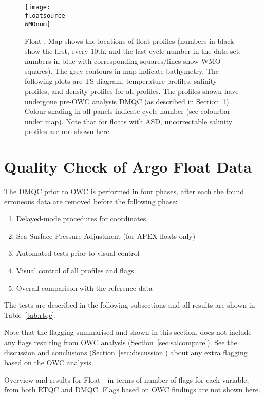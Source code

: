 \documentclass{article}
\begin{document}
\begin{figure}[hp]
  \centerline{\texttt{[image: \\floatsource\\WMOnum]}}
  \caption{Float \WMOnum. Map shows the locations of float profiles (numbers in
    black show the first, every 10th, and the last cycle number in the data
    set; numbers in blue with corresponding squares/lines show
    WMO-squares). The grey contours in map indicate bathymetry. The
    following plots are TS-diagram, temperature profiles, salinity
    profiles, and density profiles for all profiles. The profiles shown
    have undergone pre-OWC analysis DMQC (as described in
    Section~\protect\ref{DMQCpreOWC}).  Colour shading in all panels
    indicate cycle number (see colourbar under map).
    Note that for floats with ASD, uncorrectable salinity profiles are not
    shown here.}
  \label{fig:float-info}
\end{figure} 
 
        
\newpage
\section{Quality Check of Argo Float Data}\label{DMQCpreOWC}
%
The DMQC prior to OWC is performed in four phases, after each the found
erroneous data are removed before the following phase:
\begin{enumerate}
\item Delayed-mode procedures for coordinates
\item Sea Surface Pressure Adjustment (for APEX floats only)
\item Automated tests prior to visual control
\item Visual control of all profiles and flags
\item Overall comparison with the reference data
\end{enumerate}
The tests are described in the following subsections and all results are
shown in Table~\ref{tab:rtqc}.
%
%

% 
Note that the flagging summarised and shown in this section, does not
include any flags resulting from OWC analysis (Section~\ref{sec:salcompare}). See
the discussion and conclusions (Section~\ref{sec:discussion}) about any
extra flagging based on the OWC analysis.
%
\begin{table}[!ht]
  \caption{Overview and results for Float~\WMOnum\ in terms of number of
    flags for each variable, from both RTQC and DMQC. 
    Flags based on OWC findings are not shown here.}
  \label{tab:rtqc}
  \centering
  
\end{table}     
\end{document}
